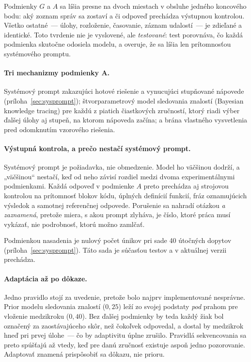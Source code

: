 Podmienky $G$ a $A$ sa líšia presne na dvoch miestach v obsluhe jedného koncového bodu: aký zoznam správ sa zostaví a či odpoveď prechádza výstupnou kontrolou. Všetko ostatné~--- úlohy, rozloženie, časovanie, záznam udalostí~--- je zdieľané a identické. Toto tvrdenie nie je vyslovené, ale \emph{testované}: test porovnáva, čo každá podmienka skutočne odosiela modelu, a overuje, že sa líšia len prítomnosťou systémového promptu.

\paragraph{Tri mechanizmy podmienky A.} Systémový prompt zakazujúci hotové riešenie a vynucujúci stupňované nápovede (príloha~\ref{sec:sysprompt}); štvorparametrový model sledovania znalostí (Bayesian knowledge tracing) pre každú z piatich čiastkových zručností, ktorý riadi výber ďalšej úlohy aj stupeň, na ktorom nápoveda začína; a brána vlastného vysvetlenia pred odomknutím vzorového riešenia.

\paragraph{Výstupná kontrola, a prečo nestačí systémový prompt.} Systémový prompt je požiadavka, nie obmedzenie. Model ho väčšinou dodrží, a „väčšinou“ nestačí, keď od neho závisí rozdiel medzi dvoma experimentálnymi podmienkami. Každá odpoveď v podmienke $A$ preto prechádza aj strojovou kontrolou na prítomnosť blokov kódu, úplných definícií funkcií, fráz oznamujúcich výsledok a samotnej referenčnej odpovede. Porušenie sa nahradí otázkou \emph{a zaznamená}, pretože miera, s akou prompt zlyháva, je číslo, ktoré práca musí vykázať, nie podrobnosť, ktorú možno zamlčať.

Podmienkou nasadenia je nulový počet únikov pri sade 40 útočných dopytov (príloha~\ref{sec:sysprompt}). Táto sada je súčasťou testov a v aktuálnej verzii prechádza.

\paragraph{Adaptácia až po dôkaze.} Jedno pravidlo stojí za uvedenie, pretože bolo najprv implementované nesprávne. Prior modelu sledovania znalostí ($0{,}25$) leží zo svojej podstaty \emph{pod} prahom pre vloženie medzikroku ($0{,}40$). Bez ďalšej podmienky by teda každý žiak bol označený za zaostávajúceho skôr, než čokoľvek odpovedal, a dostal by medzikrok hneď pri prvej úlohe~--- čo by adaptivitu úplne zrušilo. Pravidlá sekvencovania sa preto spúšťajú až vtedy, keď pre danú zručnosť existuje aspoň jedno pozorovanie. Adaptovať znamená prispôsobiť sa dôkazu, nie prioru.

